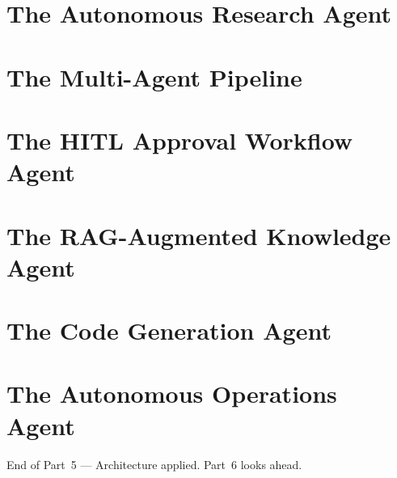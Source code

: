\documentclass[
  11pt,
  twoside,
  openright
]{book}
\makeatletter
\renewcommand{\cleardoublepage}{%
  \clearpage
  \if@twoside
    \ifodd\c@page
    \else
      \thispagestyle{empty}%
      \hbox{}%
      \newpage
      \if@twocolumn\hbox{}\newpage\fi
    \fi
  \fi
}
\newcommand{\partclose}[1]{%
  \cleardoublepage
  \vspace*{\fill}
  \begin{center}
    \sffamily\Large\color{BookBlue}#1
  \end{center}
  \vspace*{\fill}
  \cleardoublepage
}
\makeatother
\begin{document}
\chapter{The Autonomous Research Agent}
\label{ch:research-agent}

\chapter{The Multi-Agent Pipeline}
\label{ch:multi-agent-pipeline}

\chapter{The HITL Approval Workflow Agent}
\label{ch:hitl-workflow}

\chapter{The RAG-Augmented Knowledge Agent}
\label{ch:rag-knowledge-agent}

\chapter{The Code Generation Agent}
\label{ch:code-generation-agent}

\chapter{The Autonomous Operations Agent}
\label{ch:operations-agent}

\partclose{End of Part~5 --- Architecture applied.
Part~6 looks ahead.}

\end{document}
